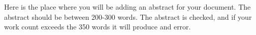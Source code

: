 Here is the place where you will be adding an abstract for your document. The abstract should be between 200-300 words. The abstract is checked, and if your work count exceeds the 350 words it will produce and error. 

\lipsum[3]

\lipsum[1]